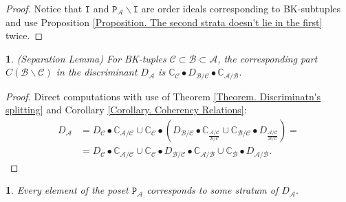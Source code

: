 \documentclass[11pt]{article}
\theoremstyle{plain}
\theoremstyle{definition}
\theoremstyle{remark}
\theoremstyle{plain}
\newtheorem{lem}[thm]{\protect\lemmaname}
\theoremstyle{plain}
\theoremstyle{plain}
\newtheorem{cor}[thm]{\protect\corollaryname}
\theoremstyle{definition}
\providecommand{\corollaryname}{Corollary}
\providecommand{\lemmaname}{Lemma}
\begin{document}
\begin{proof}
Notice that $\mathtt{I}$ and $\mathtt{P}_{\mathscr{A}}\backslash\mathtt{I}$
are order ideals corresponding to BK-subtuples and use Proposition
\ref{Proposition. The second strata doesn't lie in the first} twice.
\end{proof}
\begin{lem}
\textup{(Separation Lemma)} \label{Lemma. Separation Lemma}For BK-tuples
$\mathscr{C}\subset\mathscr{B}\subset\mathscr{A}$, the corresponding
part $C(\mathscr{B}\backslash\mathscr{C})$ in the discriminant $D_{\mathscr{A}}$
is $\mathbb{C}_{\mathscr{C}}\bullet D_{\mathscr{B}/\mathscr{C}}\bullet\mathbb{C}_{\mathscr{A}/\mathscr{B}}.$
\end{lem}

\begin{proof}
Direct computations with use of Theorem \ref{Theorem. Discriminatn's splitting}
and Corollary \ref{Corollary. Coherency Relations}:
\begin{align*}
D_{\mathscr{A}} & =D_{\mathscr{C}}\bullet\mathbb{C}_{\mathscr{A}/\mathscr{C}}\cup\mathbb{C}_{\mathscr{C}}\bullet(D_{\mathscr{B}/\mathscr{C}}\bullet\mathbb{C}_{\frac{\mathscr{A}/\mathscr{C}}{\mathscr{B}/\mathscr{C}}}\cup\mathbb{C}_{\mathscr{B}/\mathscr{C}}\bullet D_{\frac{\mathscr{A}/\mathscr{C}}{\mathscr{B}/\mathscr{C}}})=\\
 & =D_{\mathscr{C}}\bullet\mathbb{C}_{\mathscr{A}/\mathscr{C}}\cup\mathbb{C}_{\mathscr{C}}\bullet D_{\mathscr{B}/\mathscr{C}}\bullet\mathbb{C}_{\mathscr{A}/\mathscr{B}}\cup\mathbb{C}_{\mathscr{B}}\bullet D_{\mathscr{A}/\mathscr{B}}.
\end{align*}
\end{proof}
\begin{cor}
\label{Corollary. Subtuple from the decomposition corresponds to irreducible stratum}Every
element of the poset $\mathtt{P}_{\mathscr{A}}$ corresponds to some
stratum of $D_{\mathscr{A}}.$
\end{cor}
\end{document}
